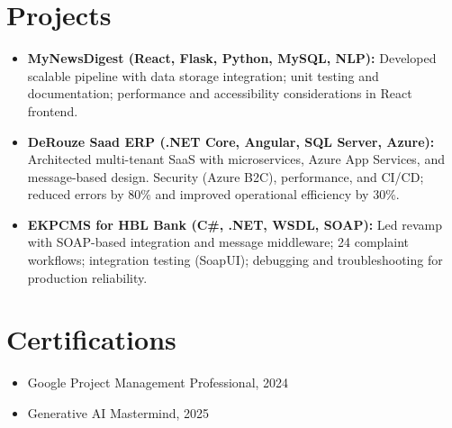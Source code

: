 \documentclass[letterpaper,10pt]{article}
\begin{document}
\section{Projects}
\begin{itemize}
    \setlength\itemsep{3pt}
    \item \textbf{MyNewsDigest (React, Flask, Python, MySQL, NLP):} Developed scalable pipeline with data storage integration; unit testing and documentation; performance and accessibility considerations in React frontend.
    \item \textbf{DeRouze Saad ERP (.NET Core, Angular, SQL Server, Azure):} Architected multi-tenant SaaS with microservices, Azure App Services, and message-based design. Security (Azure B2C), performance, and CI/CD; reduced errors by 80\% and improved operational efficiency by 30\%.
    \item \textbf{EKPCMS for HBL Bank (C\#, .NET, WSDL, SOAP):} Led revamp with SOAP-based integration and message middleware; 24 complaint workflows; integration testing (SoapUI); debugging and troubleshooting for production reliability.
\end{itemize}

\section{Certifications}
\begin{itemize}
    \item Google Project Management Professional, 2024
    \item Generative AI Mastermind, 2025
\end{itemize}

\vspace*{\fill}
\end{document}
